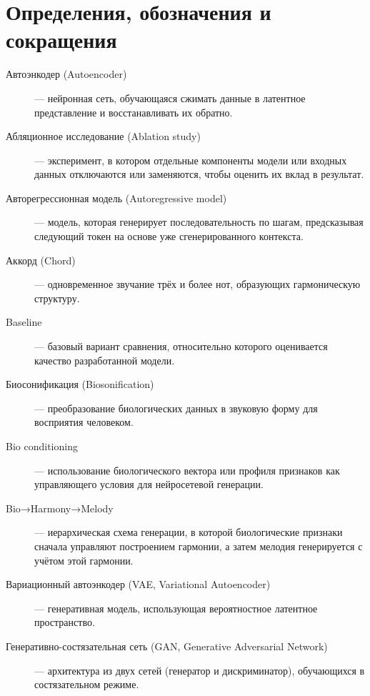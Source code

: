 \chapter*{Определения, обозначения и сокращения}

\begin{description}

\item[Автоэнкодер (Autoencoder)] — нейронная сеть, обучающаяся сжимать данные в латентное представление и восстанавливать их обратно.

\item[Абляционное исследование (Ablation study)] — эксперимент, в котором отдельные компоненты модели или входных данных отключаются или заменяются, чтобы оценить их вклад в результат.

\item[Авторегрессионная модель (Autoregressive model)] — модель, которая генерирует последовательность по шагам, предсказывая следующий токен на основе уже сгенерированного контекста.

\item[Аккорд (Chord)] — одновременное звучание трёх и более нот, образующих гармоническую структуру.

\item[Baseline] — базовый вариант сравнения, относительно которого оценивается качество разработанной модели.

\item[Биосонификация (Biosonification)] — преобразование биологических данных в звуковую форму для восприятия человеком.

\item[Bio conditioning] — использование биологического вектора или профиля признаков как управляющего условия для нейросетевой генерации.

\item[Bio→Harmony→Melody] — иерархическая схема генерации, в которой биологические признаки сначала управляют построением гармонии, а затем мелодия генерируется с учётом этой гармонии.

\item[Вариационный автоэнкодер (VAE, Variational Autoencoder)] — генеративная модель, использующая вероятностное латентное пространство.

\item[Генеративно-состязательная сеть (GAN, Generative Adversarial Network)] — архитектура из двух сетей (генератор и дискриминатор), обучающихся в состязательном режиме.


\end{description}
